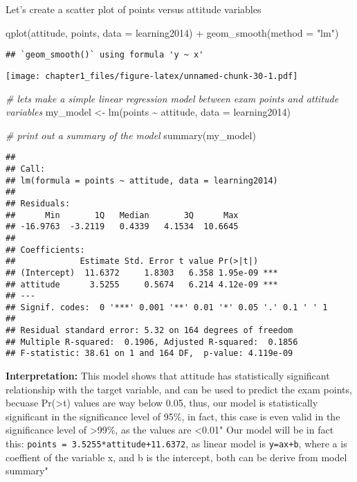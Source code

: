 \documentclass[
]{article}
\newenvironment{Shaded}{\begin{snugshade}}{\end{snugshade}}
\newcommand{\AttributeTok}[1]{\textcolor[rgb]{0.77,0.63,0.00}{#1}}
\newcommand{\CommentTok}[1]{\textcolor[rgb]{0.56,0.35,0.01}{\textit{#1}}}
\newcommand{\FunctionTok}[1]{\textcolor[rgb]{0.00,0.00,0.00}{#1}}
\newcommand{\NormalTok}[1]{#1}
\newcommand{\OtherTok}[1]{\textcolor[rgb]{0.56,0.35,0.01}{#1}}
\newcommand{\SpecialCharTok}[1]{\textcolor[rgb]{0.00,0.00,0.00}{#1}}
\newcommand{\StringTok}[1]{\textcolor[rgb]{0.31,0.60,0.02}{#1}}
\begin{document}
Let's create a scatter plot of points versus attitude variables

\begin{Shaded}
\begin{Highlighting}[]
\FunctionTok{qplot}\NormalTok{(attitude, points, }\AttributeTok{data =}\NormalTok{ learning2014) }\SpecialCharTok{+} \FunctionTok{geom\_smooth}\NormalTok{(}\AttributeTok{method =} \StringTok{"lm"}\NormalTok{)}
\end{Highlighting}
\end{Shaded}

\begin{verbatim}
## `geom_smooth()` using formula 'y ~ x'
\end{verbatim}

\texttt{[image: chapter1\_files/figure-latex/unnamed-chunk-30-1.pdf]}

\begin{Shaded}
\begin{Highlighting}[]
\CommentTok{\# let\textquotesingle{}s make a simple linear regression model between exam points and attitude variables}
\NormalTok{my\_model }\OtherTok{\textless{}{-}} \FunctionTok{lm}\NormalTok{(points }\SpecialCharTok{\textasciitilde{}}\NormalTok{ attitude, }\AttributeTok{data =}\NormalTok{ learning2014)}

\CommentTok{\# print out a summary of the model}
\FunctionTok{summary}\NormalTok{(my\_model)}
\end{Highlighting}
\end{Shaded}

\begin{verbatim}
## 
## Call:
## lm(formula = points ~ attitude, data = learning2014)
## 
## Residuals:
##      Min       1Q   Median       3Q      Max 
## -16.9763  -3.2119   0.4339   4.1534  10.6645 
## 
## Coefficients:
##             Estimate Std. Error t value Pr(>|t|)    
## (Intercept)  11.6372     1.8303   6.358 1.95e-09 ***
## attitude      3.5255     0.5674   6.214 4.12e-09 ***
## ---
## Signif. codes:  0 '***' 0.001 '**' 0.01 '*' 0.05 '.' 0.1 ' ' 1
## 
## Residual standard error: 5.32 on 164 degrees of freedom
## Multiple R-squared:  0.1906, Adjusted R-squared:  0.1856 
## F-statistic: 38.61 on 1 and 164 DF,  p-value: 4.119e-09
\end{verbatim}

\textbf{Interpretation:} This model shows that attitude has
statistically significant relationship with the target variable, and can
be used to predict the exam points, becuase
Pr(\textgreater\textbar t\textbar) values are way below 0.05, thus, our
model is statistically significant in the significance level of 95\%, in
fact, this case is even valid in the significance level of
\textgreater99\%, as the values are \textless0.01" Our model will be in
fact this: \texttt{points\ =\ 3.5255*attitude+11.6372}, as linear model
is \texttt{y=ax+b}, where a is coeffient of the variable x, and b is the
intercept, both can be derive from model summary"
\end{document}

